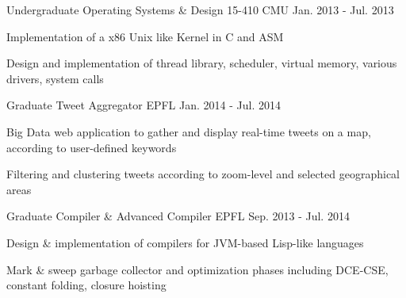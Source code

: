 


\begin{cventries}


\cventry
{Undergraduate} %
{Operating Systems \& Design 15-410} %
{CMU} %
{Jan. 2013 - Jul. 2013} %
{ %
\begin{cvitems}
\item {Implementation of a x86 Unix like Kernel in C and ASM}
\item{Design and implementation of thread library, scheduler, virtual memory, various drivers, system calls}
\end{cvitems}
}

\cventry
{Graduate}
{Tweet Aggregator}
{EPFL}
{Jan. 2014 - Jul. 2014}
{
	\begin{cvitems}
  \item{Big Data web application to gather and display real-time tweets on a map, according to user-defined keywords}
  \item{Filtering and clustering tweets according to zoom-level and selected geographical areas}
	\end{cvitems}
}

\cventry
{Graduate}
{Compiler \& Advanced Compiler}
{EPFL}
{Sep. 2013 - Jul. 2014}
{
	\begin{cvitems}
  \item{Design \& implementation of compilers for JVM-based Lisp-like languages}
  \item{Mark \& sweep garbage collector and optimization phases including DCE-CSE, constant folding, closure hoisting}
	\end{cvitems}
}

\end{cventries}

